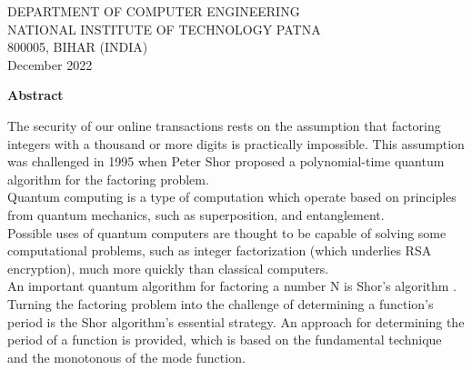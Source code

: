 \documentclass{article}
\begin{document}
\begin{center}
DEPARTMENT OF COMPUTER ENGINEERING \vspace{3ex} \\
NATIONAL INSTITUTE OF TECHNOLOGY PATNA \vspace{2ex} \\ 
800005, BIHAR (INDIA) \vspace{2ex} \\
December 2022
\end{center}





\newpage
{}
    \begin{center}
        \large \textbf{Abstract}
    \end{center}

    The security of our online transactions rests on the assumption that factoring integers with a thousand or more digits is practically impossible. This assumption was challenged in 1995 when Peter Shor proposed a polynomial-time quantum algorithm for the factoring problem. \\
    
    Quantum computing is a type of computation which operate based on principles from quantum mechanics, such as superposition, and entanglement. \\
    
    Possible uses of quantum computers are thought to
    be capable of solving some computational problems,
    such as integer factorization (which underlies RSA
    encryption), much more quickly than classical
    computers. \\

    An important quantum algorithm for factoring a number N is Shor's algorithm \cite{shor1994polynomial}. Turning the factoring problem into the challenge of determining a function's period is the Shor algorithm's essential strategy. An approach for determining the period of a function is provided, which is based on the fundamental technique and the monotonous of the mode function. \\
\end{document}
